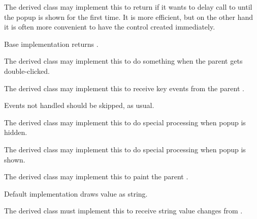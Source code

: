 
The derived class may implement this to return
\true if it wants to delay call to 
until the popup is shown for the first time. It is more
efficient, but on the other hand it is often more convenient
to have the control created immediately.


Base implementation returns \false.


\label{wxcombopopuponcombodoubleclick}


The derived class may implement this to do something
when the parent  gets double-clicked.


\label{wxcombopopuponcombokeyevent}


The derived class may implement this to receive
key events from the parent .

Events not handled should be skipped, as usual.


\label{wxcombopopupondismiss}


The derived class may implement this to do
special processing when popup is hidden.


\label{wxcombopopuponpopup}


The derived class may implement this to do
special processing when popup is shown.


\label{wxcombopopuppaintcombocontrol}


The derived class may implement this to paint
the parent .

Default implementation draws value as string.


\label{wxcombopopupsetstringvalue}


The derived class must implement this to receive
string value changes from .


